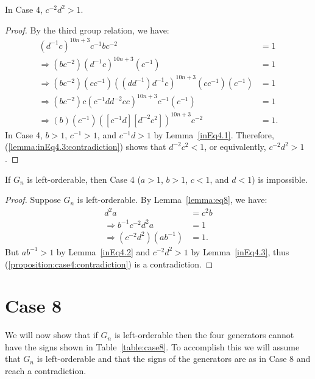 \begin{lemma} In Case 4, $c^{-2}d^{2}>1$.\label{inEq4.3}
\end{lemma}
\begin{proof} By the third group relation, we have:
\begin{align}
(d^{-1}c)^{10n+3}c^{-1}bc^{-2}&=1\nonumber{}\\
\Rightarrow(bc^{-2})(d^{-1}c)^{10n+3}(c^{-1})&=1\nonumber{}\\
\Rightarrow(bc^{-2})(cc^{-1})((dd^{-1})d^{-1}c)^{10n+3}(cc^{-1})(c^{-1})&=1\nonumber{}\\
\Rightarrow(bc^{-2})c(c^{-1}dd^{-2}cc)^{10n+3}c^{-1}(c^{-1})&=1\nonumber{}\\
\Rightarrow(b)(c^{-1})([c^{-1}d][d^{-2}c^2])^{10n+3}c^{-2}&=1.\label{lemma:inEq4.3:contradiction}
\end{align}
In Case 4, $b>1$, $c^{-1}>1$, and $c^{-1}d>1$ by Lemma~\ref{inEq4.1}. Therefore, (\ref{lemma:inEq4.3:contradiction}) shows that $d^{-2}c^2<1$, or equivalently, $c^{-2}d^2>1$.
\end{proof}

\begin{proposition} If $G_n$ is left-orderable, then Case 4 ($a>1$, $b>1$, $c<1$, and $d<1$) is impossible.
\end{proposition}
\begin{proof} Suppose $G_n$ is left-orderable. By Lemma~\ref{lemma:eq8}, we have:
\begin{align}
d^2a&=c^2b\nonumber{}\\
\Rightarrow b^{-1}c^{-2}d^2a&=1\nonumber{}\\
\Rightarrow (c^{-2}d^2)(ab^{-1})&=1.\label{proposition:case4:contradiction}
\end{align}
But $ab^{-1}>1$ by Lemma~\ref{inEq4.2} and $c^{-2}d^2>1$ by Lemma~\ref{inEq4.3}, thus (\ref{proposition:case4:contradiction}) is a contradiction.
\end{proof}


\section{Case 8}
\label{section:case8}

\noindent{}We will now show that if $G_n$ is left-orderable then the four generators cannot have the signs shown in Table~\ref{table:case8}. To accomplish this we will assume that $G_n$ is left-orderable and that the signs of the generators are as in Case 8 and reach a contradiction. 

